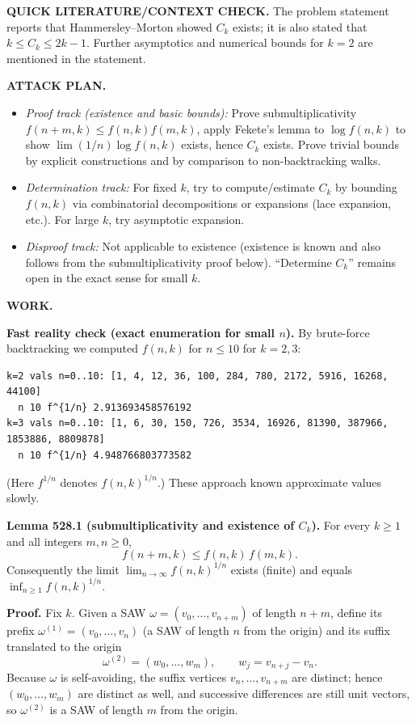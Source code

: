 \bigskip
\noindent\textbf{QUICK LITERATURE/CONTEXT CHECK.}
The problem statement reports that Hammersley--Morton showed $C_k$ exists; it is also stated that $k\le C_k\le 2k-1$. Further asymptotics and numerical bounds for $k=2$ are mentioned in the statement.

\bigskip
\noindent\textbf{ATTACK PLAN.}
\begin{itemize}
\item \emph{Proof track (existence and basic bounds):} Prove submultiplicativity $f(n+m,k)\le f(n,k)f(m,k)$, apply Fekete's lemma to $\log f(n,k)$ to show $\lim (1/n)\log f(n,k)$ exists, hence $C_k$ exists. Prove trivial bounds by explicit constructions and by comparison to non-backtracking walks.
\item \emph{Determination track:} For fixed $k$, try to compute/estimate $C_k$ by bounding $f(n,k)$ via combinatorial decompositions or expansions (lace expansion, etc.). For large $k$, try asymptotic expansion.
\item \emph{Disproof track:} Not applicable to existence (existence is known and also follows from the submultiplicativity proof below). ``Determine $C_k$'' remains open in the exact sense for small $k$.
\end{itemize}

\bigskip
\noindent\textbf{WORK.}

\medskip
\noindent\textbf{Fast reality check (exact enumeration for small $n$).}
By brute-force backtracking we computed $f(n,k)$ for $n\le 10$ for $k=2,3$:
\begin{verbatim}
k=2 vals n=0..10: [1, 4, 12, 36, 100, 284, 780, 2172, 5916, 16268, 44100]
  n 10 f^{1/n} 2.913693458576192
k=3 vals n=0..10: [1, 6, 30, 150, 726, 3534, 16926, 81390, 387966, 1853886, 8809878]
  n 10 f^{1/n} 4.948766803773582
\end{verbatim}
(Here $f^{1/n}$ denotes $f(n,k)^{1/n}$.) These approach known approximate values slowly.

\medskip
\noindent\textbf{Lemma 528.1 (submultiplicativity and existence of $C_k$).}
For every $k\ge 1$ and all integers $m,n\ge 0$,
\[f(n+m,k)\le f(n,k)\,f(m,k).
\]
Consequently the limit $\lim_{n\to\infty} f(n,k)^{1/n}$ exists (finite) and equals $\inf_{n\ge 1} f(n,k)^{1/n}$.

\noindent\textbf{Proof.}
Fix $k$.
Given a SAW $\omega=(v_0,\dots,v_{n+m})$ of length $n+m$, define its prefix $\omega^{(1)}=(v_0,\dots,v_n)$ (a SAW of length $n$ from the origin) and its suffix translated to the origin
\[\omega^{(2)} = (w_0,\dots,w_m),\qquad w_j = v_{n+j}-v_n.
\]
Because $\omega$ is self-avoiding, the suffix vertices $v_n,\dots,v_{n+m}$ are distinct; hence $(w_0,\dots,w_m)$ are distinct as well, and successive differences are still unit vectors, so $\omega^{(2)}$ is a SAW of length $m$ from the origin.

